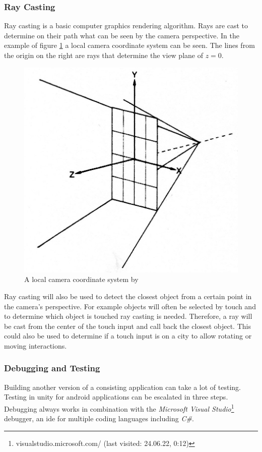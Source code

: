 \subsubsection{Ray Casting}
\label{sec:ray}
Ray casting is a basic computer graphics rendering algorithm. 
Rays are cast to determine on their path what can be seen by the camera perspective. 
In the example of figure \ref{fig:ray_example} a local camera coordinate system can be seen.
The lines from the origin on the right are rays that determine the view plane of $z=0$.
\begin{figure}[htb]
    \centering
    \includegraphics[width=1\textwidth]{Fundamentals/img/ray_casting.jpg}
    \caption{A local camera coordinate system by \cite{roth1982ray}}
    \label{fig:ray_example}
\end{figure}

Ray casting will also be used to detect the closest object from a certain point in the camera's perspective.
For example objects will often be selected by touch and to determine which object is touched ray casting is needed.
Therefore, a ray will be cast from the center of the touch input and call back the closest object. 
This could also be used to determine if a touch input is on a \gls{city} to allow rotating or moving interactions. 

\subsubsection{Debugging and Testing}
Building another version of a consisting application can take a lot of testing.
Testing in \gls{unity} for \gls{android} applications can be escalated in three steps. 
Debugging always works in combination with the \textit{Microsoft Visual Studio}\footnote{visualstudio.microsoft.com/ (last visited: 24.06.22, 0:12)} debugger, an \gls{ide} for multiple coding languages including \textit{C\#}.

